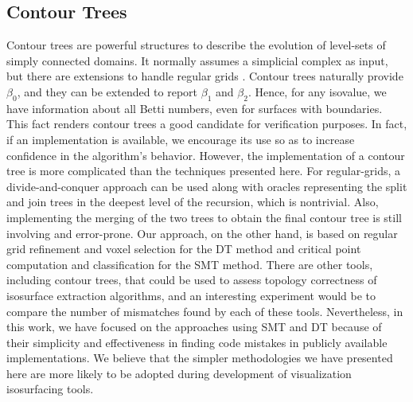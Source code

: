 \subsection{Contour Trees}
Contour trees \cite{Hamish03} are powerful structures to describe the
evolution of level-sets of simply connected domains. It normally
assumes a simplicial complex as input, but there are extensions to
handle regular grids \cite{Pascucci03}. Contour trees naturally provide
$\beta_0$, and they can be extended to report $\beta_1$ and
$\beta_2$. Hence, for any isovalue, we have information about all
Betti numbers, even for surfaces with boundaries.  This fact renders
contour trees a good candidate for verification purposes. In fact, if an
implementation is available, we encourage its use so as to increase
confidence in the algorithm's behavior.  However, the implementation of
a contour tree is more complicated than the techniques presented here.
For regular-grids, a divide-and-conquer approach can be used along
with oracles representing the split and join trees in the deepest
level of the recursion, which is nontrivial. Also, implementing the
merging of the two trees to obtain the final contour tree is still
involving and error-prone.  Our approach, on the other
hand, is based on regular grid refinement and voxel selection for the DT
method and critical point computation and classification for the SMT
method.  There are other tools, including contour trees, that could be
used to assess topology correctness of isosurface extraction
algorithms, and an interesting experiment would be to compare the
number of mismatches found by each of these tools.  Nevertheless, in
this work, we have focused on the approaches using SMT and DT because
of their simplicity and effectiveness in finding code
mistakes in publicly available implementations.  We believe that the
simpler methodologies we have presented here are more likely to be
adopted during development of visualization isosurfacing tools.

